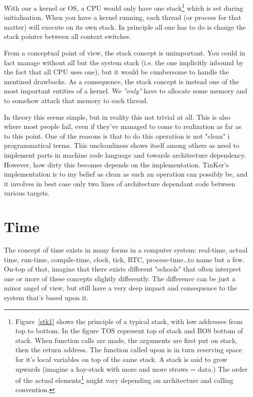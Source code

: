 		With our a kernel or OS, a CPU would only have one stack\footnote{Figure~\ref{stk1} shows the principle of a typical stack, with low addresses from top to bottom. In the figure TOS represent top of stack and BOS bottom of stack. When function calls are made, the arguments are first put on stack, then the return address. The function called upon is in turn reserving space for it's local variables on top of the same stack. A stack is said to grow upwards (imagine a hay-stack with more and more straws = data.) The order of the actual elements\footnote{Return address, function arguments, local variables} might vary depending on architecture and calling convention.} which is set during initialisation. When you have a kernel running, each thread (or process for that matter) will execute on its own stack. In principle all one has to do is change the stack pointer between all context switches.

		From a conceptual point of view, the stack concept is unimportant. You could in fact manage without all but the system stack (i.e. the one implicitly inbound by the fact that all CPU uses one), but it would be cumbersome to handle the mentined drawbacks. As a consequence, the stack concept is instead one of the most important entities of a kernel. We \textit{"only"} have to allocate some memory and to somehow attach that memory to each thread. 

		In theory this seems simple, but in reality this not trivial at all. This is also where most people fail, even if they've managed to come to realization as far as to this point. One of the reasons is that to do this operation is not "clean" i programmatical terms. This uncleanliness shows itself among others as need to implement parts in machine code language and towards architecture dependency. However, how dirty this becomes depends on the implementation. TinKer's implementation is to my belief as clean as such an operation can possibly be, and it involves in best case only two lines of architecture dependant code between various targets.

	\section{Time}
		The concept of time exists in many forms in a computer system: real-time, actual time, run-time, compile-time, clock, tick, RTC, process-time\ldots to name but a few. On-top of that, imagine that there exists different "schools" that often interpret one or more of these concepts slightly differently. The difference can be just a minor angel of view, but still have a very deep impact and consequence to the system that's based upon it.

